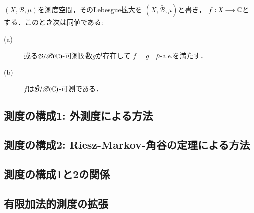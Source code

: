 		\begin{screen}
			\begin{cor}
				$(X,\mathcal{B},\mu)$を測度空間，そのLebesgue拡大を
				$(X,\bar{\mathcal{B}},\bar{\mu})$と書き，
				$f:X \longrightarrow \mathbb{C}$とする．このとき次は同値である:
				\begin{description}
					\item[(a)] 或る$\mathcal{B}/\mathscr{B}(\mathbb{C})$-可測関数$g$が存在して
						$f = g\quad \mbox{$\bar{\mu}$-a.e.}$を満たす．
					\item[(b)] $f$は$\bar{\mathcal{B}}/\mathscr{B}(\mathbb{C})$-可測である．
				\end{description}
			\end{cor}
		\end{screen}
	
	\subsection{測度の構成1: 外測度による方法}
	\subsection{測度の構成2: Riesz-Markov-角谷の定理による方法}
	\subsection{測度の構成1と2の関係}
	\subsection{有限加法的測度の拡張}